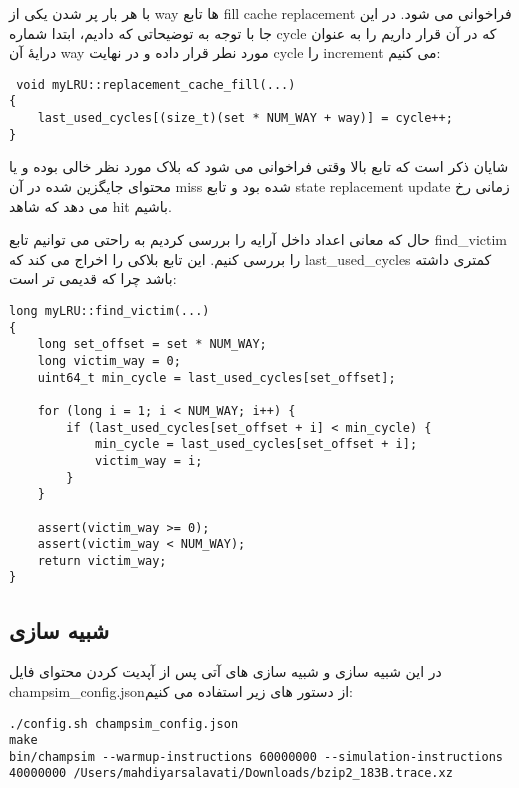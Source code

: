 \documentclass[17pt]{article}
\begin{document}
با هر بار پر شدن یکی از way ها تابع fill cache replacement فراخوانی می شود. در این جا با توجه به توضیحاتی که دادیم، ابتدا شماره cycle که در آن قرار داریم را به عنوان درایهٔ آن way مورد نطر قرار داده و در نهایت cycle را increment می کنیم:

\begin{LTR}
\begin{lstlisting}
 void myLRU::replacement_cache_fill(...)
{
    last_used_cycles[(size_t)(set * NUM_WAY + way)] = cycle++;
}
\end{lstlisting}
\end{LTR}

شایان ذکر است که تابع بالا وقتی فراخوانی می شود که بلاک مورد نظر خالی بوده و یا محتوای جایگزین شده در آن miss شده بود و تابع state replacement update زمانی رخ می دهد که شاهد hit باشیم.

حال که معانی اعداد داخل آرایه را بررسی کردیم به راحتی می توانیم تابع find\_victim را بررسی کنیم. این تابع بلاکی را اخراج می کند که last\_used\_cycles کمتری داشته باشد چرا که قدیمی تر است:

\begin{LTR}
\begin{lstlisting}
long myLRU::find_victim(...)
{
    long set_offset = set * NUM_WAY;
    long victim_way = 0;
    uint64_t min_cycle = last_used_cycles[set_offset];

    for (long i = 1; i < NUM_WAY; i++) {
        if (last_used_cycles[set_offset + i] < min_cycle) {
            min_cycle = last_used_cycles[set_offset + i];
            victim_way = i;
        }
    }

    assert(victim_way >= 0);
    assert(victim_way < NUM_WAY);
    return victim_way;
}
\end{lstlisting}
\end{LTR}

\subsection{شبیه سازی}
در این شبیه سازی و شبیه سازی های آتی پس از آپدیت کردن محتوای فایل champsim\_config.jsonاز دستور های زیر استفاده می کنیم:
\begin{LTR}
\begin{lstlisting}
./config.sh champsim_config.json
make
bin/champsim --warmup-instructions 60000000 --simulation-instructions 40000000 /Users/mahdiyarsalavati/Downloads/bzip2_183B.trace.xz
\end{lstlisting}
\end{LTR}
\end{document}
